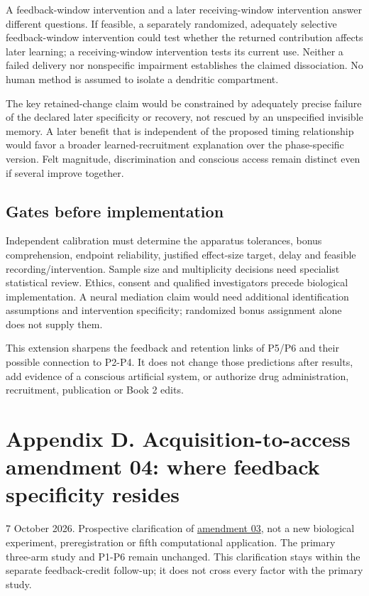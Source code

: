 \documentclass[
  american,
  11pt,
  letterpaper,
]{article}
\begin{document}
A feedback-window intervention and a later receiving-window intervention answer different questions. If feasible, a separately randomized, adequately selective feedback-window intervention could test whether the returned contribution affects later learning; a receiving-window intervention tests its current use. Neither a failed delivery nor nonspecific impairment establishes the claimed dissociation. No human method is assumed to isolate a dendritic compartment.

The key retained-change claim would be constrained by adequately precise failure of the declared later specificity or recovery, not rescued by an unspecified invisible memory. A later benefit that is independent of the proposed timing relationship would favor a broader learned-recruitment explanation over the phase-specific version. Felt magnitude, discrimination and conscious access remain distinct even if several improve together.

\subsection{Gates before implementation}\label{gates-before-implementation}

Independent calibration must determine the apparatus tolerances, bonus comprehension, endpoint reliability, justified effect-size target, delay and feasible recording/intervention. Sample size and multiplicity decisions need specialist statistical review. Ethics, consent and qualified investigators precede biological implementation. A neural mediation claim would need additional identification assumptions and intervention specificity; randomized bonus assignment alone does not supply them.

This extension sharpens the feedback and retention links of P5/P6 and their possible connection to P2-P4. It does not change those predictions after results, add evidence of a conscious artificial system, or authorize drug administration, recruitment, publication or Book 2 edits.

\clearpage
\hypertarget{appendix-d}{}

\section{Appendix D. Acquisition-to-access amendment 04: where feedback specificity resides}\label{appendix-d.-acquisition-to-access-amendment-04-where-feedback-specificity-resides}

7 October 2026. Prospective clarification of \href{https://raw.githubusercontent.com/v5ma/v5ma.github.io/master/papers/companions/learning-to-feel-v1.0/Learning-to-Feel-Technical-Supplement-v1.0.pdf\#appendix-c}{amendment 03}, not a new biological experiment, preregistration or fifth computational application. The primary three-arm study and P1-P6 remain unchanged. This clarification stays within the separate feedback-credit follow-up; it does not cross every factor with the primary study.
\end{document}
